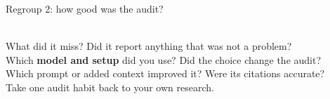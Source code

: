 \begin{frame}{Regroup 2: how good was the audit?}
  \vfill
  \begin{center}
    \\[1.1em]
    {\small What did it miss? Did it report anything that was not a problem?}\\[0.8em]
    {\small Which \textbf{model and setup} did you use? Did the choice change the audit?}\\[0.8em]
    {\small Which prompt or added context improved it? Were its citations accurate?}\\[1.1em]
    {\small Take one audit habit back to your own research.}
  \end{center}
  \vfill
\end{frame}

